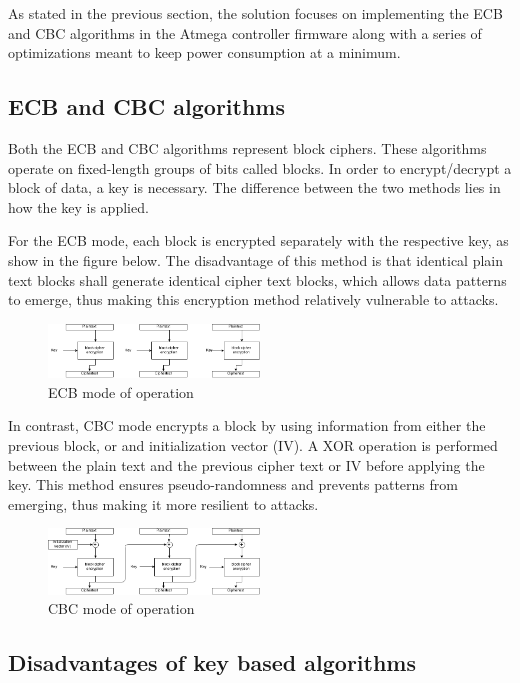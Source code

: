 As stated in the previous section, the solution focuses on implementing 
the ECB and CBC algorithms in the Atmega controller firmware along with a series 
of optimizations meant to keep power consumption at a minimum.

\subsection{ECB and CBC algorithms}

Both the ECB and CBC algorithms represent block ciphers. These algorithms operate 
on fixed-length groups of bits called blocks. In order to encrypt/decrypt a block 
of data, a key is necessary. The difference between the two methods lies in how 
the key is applied.

For the ECB mode, each block is encrypted separately with the respective key, as 
show in the figure below. The disadvantage of this method is that identical plain text 
blocks shall generate identical cipher text blocks, which allows data patterns to 
emerge, thus making this encryption method relatively vulnerable to attacks.

\begin{figure}[ht] \centering
  \includegraphics[width=0.5\textwidth]{img/ECB-function-mode.png}
  \caption{ECB mode of operation}
\end{figure}

In contrast, CBC mode encrypts a block by using information from either the previous 
block, or and initialization vector (IV). A XOR operation is performed between the 
plain text and the previous cipher text or IV before applying the key. This method 
ensures pseudo-randomness and prevents patterns from emerging, thus making it 
more resilient to attacks.

\begin{figure}[ht] \centering
  \includegraphics[width=0.5\textwidth]{img/CBC-function-mode.png}
  \caption{CBC mode of operation}
\end{figure}

\subsection{Disadvantages of key based algorithms}


